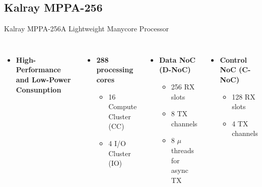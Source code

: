 	\subsection{Kalray MPPA-256}

		\begin{frame}[fragile]{Kalray MPPA-256}{A Lightweight Manycore Processor}

			\vspace{-0.45cm}

			\begin{columns}[totalwidth=\linewidth,t]

					\begin{itemize}
						\item \textbf{High-Performance and Low-Power Consunption}
					\end{itemize}

					\begin{itemize}
						\item \textbf{288 processing cores}
						\begin{itemize}
							\item {16 Compute Cluster (CC)}
							\item {4 I/O Cluster (IO)}
						\end{itemize}
					\end{itemize}

					\begin{itemize}
						\item \textbf{Data NoC (D-NoC)}
						\begin{itemize}
							\item 256 RX slots
							\item 8 TX channels
							\item 8 $\mu$threads for async TX
						\end{itemize}
					\end{itemize}

					\begin{itemize}
						\item \textbf{Control NoC (C-NoC)}
						\begin{itemize}
							\item 128 RX slots
							\item 4 TX channels
						\end{itemize}
					\end{itemize}

			\end{columns}

		\end{frame}

